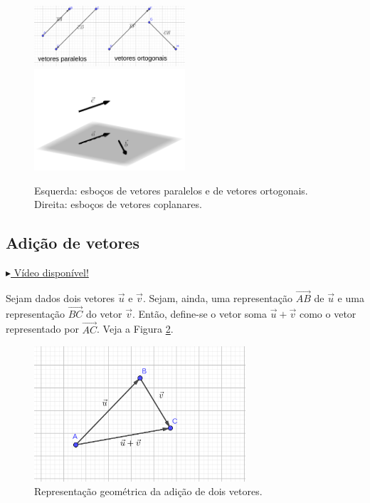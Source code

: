 \begin{figure}[h!]
  \centering
  \includegraphics[width=0.5\textwidth]{./cap_vetor/dados/fig_vetorrel/fig_vetorrel}~
  \includegraphics[width=0.5\textwidth]{./cap_vetor/dados/fig_vcolineares/fig_vcolineares}
  \caption{Esquerda: esboços de vetores paralelos e de vetores ortogonais. Direita: esboços de vetores coplanares.}
  \label{fig:vetorrel}
\end{figure}

\subsection{Adição de vetores}

\begin{flushright}
  \href{https://archive.org/details/adicao-de-vetores}{$\blacktriangleright$ Vídeo disponível!}
\end{flushright}

Sejam dados dois vetores $\vec{u}$ e $\vec{v}$. Sejam, ainda, uma representação $\overrightarrow{AB}$ de $\vec{u}$ e uma representação $\overrightarrow{BC}$ do vetor $\vec{v}$. Então, define-se o vetor soma $\vec{u}+\vec{v}$ como o vetor representado por $\overrightarrow{AC}$. Veja a Figura \ref{fig:vadicao}.

\begin{figure}[H]
  \centering
  \includegraphics[width=0.7\textwidth]{./cap_vetor/dados/fig_vadicao/fig_vadicao}
  \caption{Representação geométrica da adição de dois vetores.}
  \label{fig:vadicao}
\end{figure}

